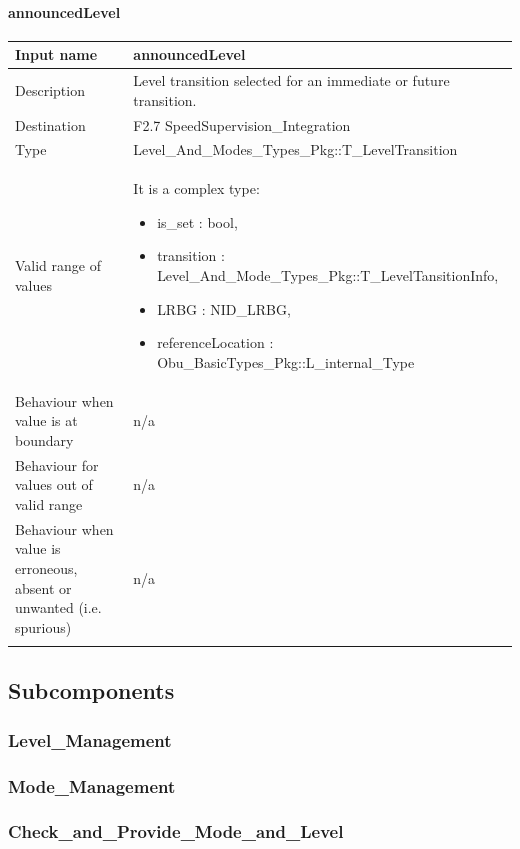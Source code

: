 \paragraph{announcedLevel}

\begin{longtable}{p{}p{}}
\toprule
Input name				& announcedLevel \\
\midrule
Description				& Level transition selected for an immediate or future transition. \\
\midrule
Destination				& F2.7 SpeedSupervision\_Integration \\ 
\midrule
Type					& Level\_And\_Modes\_Types\_Pkg::T\_LevelTransition \\
\midrule
Valid range of values	& It is a complex type:  
\begin{itemize}
\item is\_set : bool,
\item transition : Level\_And\_Mode\_Types\_Pkg::T\_LevelTansitionInfo, 
\item LRBG : NID\_LRBG, 
\item referenceLocation : Obu\_BasicTypes\_Pkg::L\_internal\_Type
\end{itemize} \\
\midrule
Behaviour when value is at boundary	& n/a \\ 
\midrule
Behaviour for values out of valid range	& n/a \\ 
\midrule
Behaviour when value is erroneous, absent or unwanted (i.e. spurious) & n/a \\ 
\bottomrule \\ 
\end{longtable}





\subsection{Subcomponents}\label{s:mdoe_and_level_subcomponents}

\subsubsection{Level\_Management}


\subsubsection{Mode\_Management}


\subsubsection{Check\_and\_Provide\_Mode\_and\_Level}




